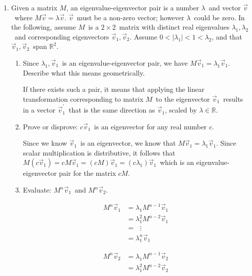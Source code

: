\documentclass{letter}
\newcommand{\norm}[1]{\lvert #1 \rvert}
\newcommand{\Vn}[1]{\vec{#1}}
\newcommand{\?}{\stackrel{?}{=}}
\newcommand\Que[1]{%
   \leavevmode\noindent
   #1
}
\newcommand\Ans[2][]{%
   \leavevmode\noindent
   {
       \begin{mdframed}[backgroundcolor=blue!10]
       #2
       \end{mdframed}
   }
}
\begin{document}
\begin{enumerate}
\begin{enumerate}[label=(\alph*)]
    \end{enumerate}
    \newpage
    \item
        Given a matrix $M$, an eigenvalue-eigenvector pair is a number $\lambda$\ and vector $\Vn{v}$\ where $M\Vn{v}=\lambda\Vn{v}$.  $\Vn{v}$\ must be a non-zero vector; however $\lambda$\ could be zero.  In the following, assume $M$\ is a $2\times 2$\ matrix with distinct real eigenvalues $\lambda_1, \lambda_2$\ and corresponding eigenvectors $\Vn{v}_1, \Vn{v}_2$.  Assume $0<\norm{\lambda_1}<1<\lambda_2$, and that $\Vn{v}_1,\Vn{v}_2$\ span $\mathbb{R}^2$.
    \begin{enumerate}[label=(\alph*)]
    \item \Que{
        Since $\lambda_1,\Vn{v}_1$\ is an eigenvalue-eigenvector pair, we have $M\Vn{v}_1=\lambda_1\Vn{v}_1$.  Describe what this means geometrically. 
    }
    \Ans{
        If there exists such a pair, it means that applying the linear transformation corresponding to matrix $M$\ to the eigenvector $\Vn{v}_1$\ results in a vector $\Vn{v}_1^\prime$\ that is the same direction as $\Vn{v}_1$, scaled by $\lambda\in\mathbb{R}$. 
    }
    \item \Que{
        Prove or disprove: $c\Vn{v}_1$\ is an eigenvector for any real number $c$.
    }
    \Ans{ 
      Since we know $\Vn{v}_1$\ is an eigenvector, we know that $M\Vn{v}_1=\lambda_1\Vn{v}_1$.  Since scalar multiplication is distributive, it follows that $M(c\Vn{v}_1) = cM\Vn{v}_1 = (cM)\Vn{v}_1 = (c\lambda_1)\Vn{v}_1$\ which is an eigenvalue-eigenvector pair for the matrix $cM$.
    }
    \item \Que{
        Evaluate: $M^n\Vn{v}_1$\ and $M^n\Vn{v}_2$.
    }
    \Ans{
       \begin{minipage}[m]{0.4\textwidth}
       \begin{align*}
           M^n\Vn{v}_1 &= \lambda_1 M^{n-1}\Vn{v}_1 \\
                       &= \lambda_1^2 M^{n-2}\Vn{v}_1 \\
                       &= ~~~\vdots \\
                       &= \lambda_1^n\Vn{v}_1
       \end{align*}
       \end{minipage}
       \begin{minipage}[m]{0.4\textwidth}
       \begin{align*}
           M^n\Vn{v}_2 &= \lambda_1 M^{n-1}\Vn{v}_2 \\
                       &= \lambda_1^2 M^{n-2}\Vn{v}_2 \\

\end{align*}
\end{minipage}}
\end{enumerate}
\end{enumerate}
\end{document}
